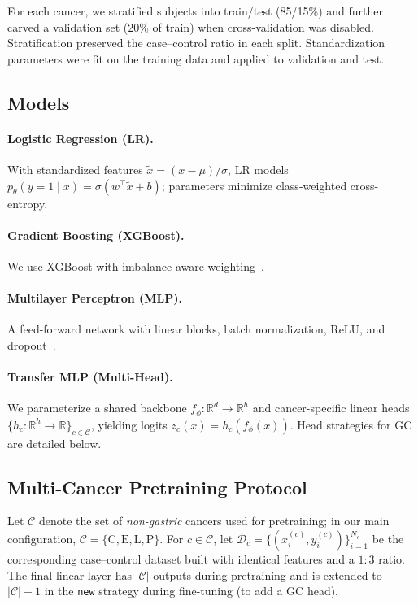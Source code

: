 \documentclass[journal,article,submit,pdftex,moreauthors]{Definitions/mdpi}
\begin{document}
For each cancer, we stratified subjects into train/test (85/15\%) and further carved a validation set (20\% of train) when cross-validation was disabled. Stratification preserved the case--control ratio in each split. Standardization parameters were fit on the training data and applied to validation and test.

\subsection{Models}

\paragraph{Logistic Regression (LR).} With standardized features $\tilde{x}=(x-\mu)/\sigma$, LR models $p_\theta(y = 1\mid x)=\sigma(w^\top \tilde{x}+b)$; parameters minimize class-weighted cross-entropy.

\paragraph{Gradient Boosting (XGBoost).} We use XGBoost with imbalance-aware weighting~\citep{Chen2016_XGBoost}.

\paragraph{Multilayer Perceptron (MLP).} A feed-forward network with linear blocks, batch normalization, ReLU, and dropout~\citep{Ioffe2015_BN,Srivastava2014_Dropout}.

\paragraph{Transfer MLP (Multi-Head).}
We parameterize a shared backbone $f_\phi:\mathbb{R}^d\!\to\!\mathbb{R}^h$ and cancer-specific linear heads $\{h_c:\mathbb{R}^h\!\to\!\mathbb{R}\}_{c\in\mathcal{C}}$, yielding logits $z_c(x)=h_c(f_\phi(x))$. Head strategies for GC are detailed below.

\subsection{Multi-Cancer Pretraining Protocol}\label{sec:pretrain_multi}

Let $\mathcal{C}$ denote the set of \emph{non-gastric} cancers used for pretraining; in our main configuration, $\mathcal{C}=\{\mathrm{C},\mathrm{E},\mathrm{L},\mathrm{P}\}$. For $c\in\mathcal{C}$, let $\mathcal{D}_c=\{(x_i^{(c)},y_i^{(c)})\}_{i=1}^{N_c}$ be the corresponding case--control dataset built with identical features and a $1{:}3$ ratio. The final linear layer has $|\mathcal{C}|$ outputs during pretraining and is extended to $|\mathcal{C}|{+}1$ in the \texttt{new} strategy during fine-tuning (to add a GC head).
\end{document}
